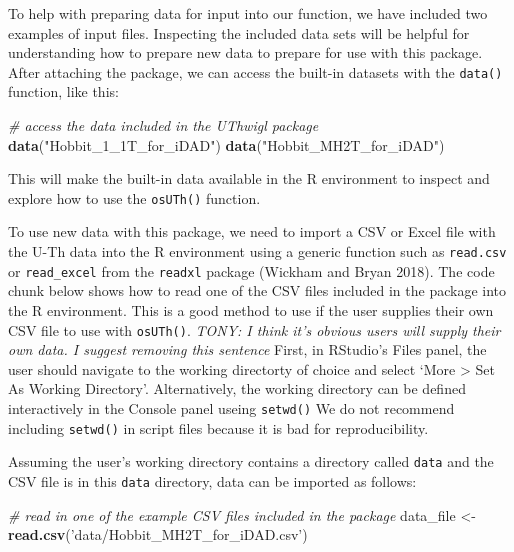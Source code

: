 \documentclass[]{elsarticle} %
\newenvironment{Shaded}{\begin{snugshade}}{\end{snugshade}}
\newcommand{\CommentTok}[1]{\textcolor[rgb]{0.56,0.35,0.01}{\textit{#1}}}
\newcommand{\KeywordTok}[1]{\textcolor[rgb]{0.13,0.29,0.53}{\textbf{#1}}}
\newcommand{\NormalTok}[1]{#1}
\newcommand{\StringTok}[1]{\textcolor[rgb]{0.31,0.60,0.02}{#1}}
\begin{document}
To help with preparing data for input into our function, we have included two examples of input files. Inspecting the included data sets will be helpful for understanding how to prepare new data to prepare for use with this package. After attaching the package, we can access the built-in datasets with the \texttt{data()} function, like this:

\begin{Shaded}
\begin{Highlighting}[]
\CommentTok{# access the data included in the UThwigl package}
\KeywordTok{data}\NormalTok{(}\StringTok{"Hobbit_1_1T_for_iDAD"}\NormalTok{)}
\KeywordTok{data}\NormalTok{(}\StringTok{"Hobbit_MH2T_for_iDAD"}\NormalTok{)}
\end{Highlighting}
\end{Shaded}

This will make the built-in data available in the R environment to inspect and explore how to use the \texttt{osUTh()} function.

To use new data with this package, we need to import a CSV or Excel file with the U-Th data into the R environment using a generic function such as \texttt{read.csv} or \texttt{read\_excel} from the \texttt{readxl} package (Wickham and Bryan 2018). The code chunk below shows how to read one of the CSV files included in the package into the R environment.
This is a good method to use if the user supplies their own CSV file to use with \texttt{osUTh()}. \emph{TONY: I think it's obvious users will supply their own data. I suggest removing this sentence}
First, in RStudio's Files panel, the user should navigate to the working directorty of choice and select `More \textgreater{} Set As Working Directory'. Alternatively, the working directory can be defined interactively in the Console panel useing \texttt{setwd()} We do not recommend including \texttt{setwd()} in script files because it is bad for reproducibility.

Assuming the user's working directory contains a directory called \texttt{data} and the CSV file is in this \texttt{data} directory, data can be imported as follows:

\begin{Shaded}
\begin{Highlighting}[]
\CommentTok{# read in one of the example CSV files included in the package}
\NormalTok{data_file <-}
\StringTok{  }\KeywordTok{read.csv}\NormalTok{(}\StringTok{'data/Hobbit_MH2T_for_iDAD.csv'}\NormalTok{)}
\end{Highlighting}
\end{Shaded}
\end{document}

